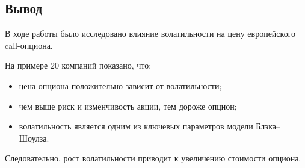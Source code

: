 \subsection*{Вывод}

В ходе работы было исследовано влияние волатильности на цену европейского call-опциона.

На примере 20 компаний показано, что:
\begin{itemize}
    \item цена опциона положительно зависит от волатильности;
    \item чем выше риск и изменчивость акции, тем дороже опцион;
    \item волатильность является одним из ключевых параметров модели Блэка--Шоулза.
\end{itemize}

Следовательно, рост волатильности приводит к увеличению стоимости опциона.
